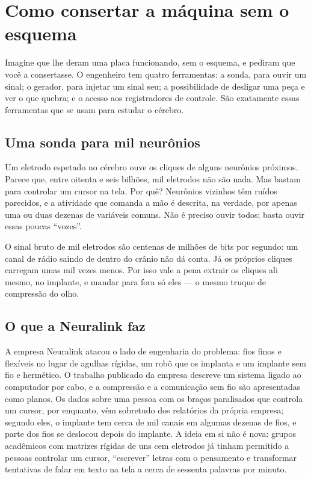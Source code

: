 \chapter{Como consertar a máquina sem o esquema}


Imagine que lhe deram uma placa funcionando, sem o esquema, e pediram que você a consertasse. O engenheiro tem quatro ferramentas: a sonda, para ouvir um sinal; o gerador, para injetar um sinal seu; a possibilidade de desligar uma peça e ver o que quebra; e o acesso aos registradores de controle. São exatamente essas ferramentas que se usam para estudar o cérebro.

\section*{Uma sonda para mil neurônios}

Um eletrodo espetado no cérebro ouve os cliques de alguns neurônios próximos. Parece que, entre oitenta e seis bilhões, mil eletrodos não são nada. Mas bastam para controlar um cursor na tela. Por quê? Neurônios vizinhos têm ruídos parecidos, e a atividade que comanda a mão é descrita, na verdade, por apenas uma ou duas dezenas de variáveis comuns. Não é preciso ouvir todos; basta ouvir essas poucas ``vozes''.

O sinal bruto de mil eletrodos são centenas de milhões de bits por segundo: um canal de rádio saindo de dentro do crânio não dá conta. Já os próprios cliques carregam umas mil vezes menos. Por isso vale a pena extrair os cliques ali mesmo, no implante, e mandar para fora só eles --- o mesmo truque de compressão do olho.

\section*{O que a Neuralink faz}

A empresa Neuralink atacou o lado de engenharia do problema: fios finos e flexíveis no lugar de agulhas rígidas, um robô que os implanta e um implante sem fio e hermético. O trabalho publicado da empresa descreve um sistema ligado ao computador por cabo, e a compressão e a comunicação sem fio são apresentadas como planos. Os dados sobre uma pessoa com os braços paralisados que controla um cursor, por enquanto, vêm sobretudo dos relatórios da própria empresa; segundo eles, o implante tem cerca de mil canais em algumas dezenas de fios, e parte dos fios se deslocou depois do implante. A ideia em si não é nova: grupos acadêmicos com matrizes rígidas de uns cem eletrodos já tinham permitido a pessoas controlar um cursor, ``escrever'' letras com o pensamento e transformar tentativas de falar em texto na tela a cerca de sessenta palavras por minuto.

